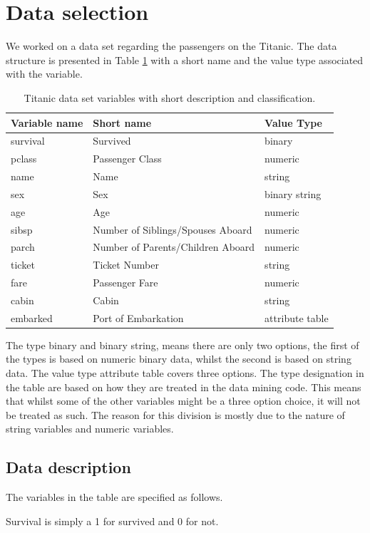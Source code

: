 \documentclass[a4paper,11pt]{article}
\begin{document}
\section{Data selection}
We worked on a data set regarding the passengers on the Titanic. The data structure is presented in Table \ref{titanData} with a short name and the value type associated with the variable.
\begin{table}[h]
\begin{tabular}{|l|l|l|}
\hline
Variable name & Short name & Value Type\\
\hline
survival & Survived & binary\\
pclass & Passenger Class & numeric\\
name & Name & string\\
sex & Sex & binary string\\
age & Age & numeric\\
sibsp & Number of Siblings/Spouses Aboard & numeric\\
parch & Number of Parents/Children Aboard & numeric\\
ticket & Ticket Number & string\\
fare & Passenger Fare & numeric\\
cabin & Cabin & string\\
embarked & Port of Embarkation & attribute table\\
\hline
\end{tabular}
\caption{Titanic data set variables with short description and classification.}
\label{titanData}
\end{table}

The type binary and binary string, means there are only two options, the first of the types is based on numeric binary data, whilst the second is based on string data. The value type attribute table covers three options. The type designation in the table are based on how they are treated in the data mining code. This means that whilst some of the other variables might be a three option choice, it will not be treated as such. The reason for this division is mostly due to the nature of string variables and numeric variables.

\subsection{Data description}
The variables in the table are specified as follows. 

Survival is simply a 1 for survived and 0 for not. 
\end{document}
